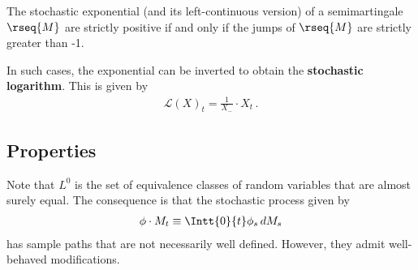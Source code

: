     \begin{property}\label{stoch:stochastic_logarithm}
        The stochastic exponential (and its left-continuous version) of a semimartingale $\rseq{M}$ are strictly positive if and only if the jumps of $\rseq{M}$ are strictly greater than -1.

        In such cases, the exponential can be inverted to obtain the \textbf{stochastic logarithm}. This is given by
        \begin{gather}
            \mathcal{L}(X)_t = \frac{1}{X_-}\cdot X_t\,.
        \end{gather}
    \end{property}

\subsection{Properties}

    Note that $L^0$ is the set of equivalence classes of random variables that are almost surely equal. The consequence is that the stochastic process given by
    \begin{gather}
        \phi\cdot M_t \equiv \Intt{0}{t}\phi_s\,dM_s
    \end{gather}
    has sample paths that are not necessarily well defined. However, they admit well-behaved modifications.

